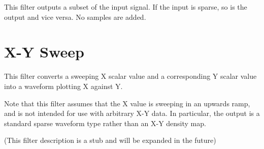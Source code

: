 This filter outputs a subset of the input signal. If the input is sparse, so is the output and vice versa. No samples
are added.

\pagebreak
\section{X-Y Sweep}

This filter converts a sweeping X scalar value and a corresponding Y scalar value into a waveform plotting X against Y.

Note that this filter assumes that the X value is sweeping in an upwards ramp, and is not intended for use with
arbitrary X-Y data. In particular, the output is a standard sparse waveform type rather than an X-Y density map.

(This filter description is a stub and will be expanded in the future)

